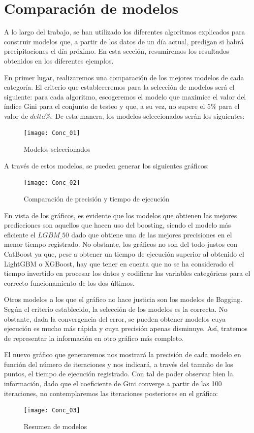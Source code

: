 \documentclass[12pt,twoside]{article}
\begin{document}
\newpage
\section{Comparación de modelos}

A lo largo del trabajo, se han utilizado los diferentes algoritmos explicados para construir modelos que, a partir de los datos de un día actual, predigan si habrá precipitaciones el día próximo. En esta sección, resumiremos los resultados obtenidos en los diferentes ejemplos.

En primer lugar, realizaremos una comparación de los mejores modelos de cada categoría. El criterio que estableceremos para la selección de modelos será el siguiente: para cada algoritmo, escogeremos el modelo que maximice el valor del índice Gini para el conjunto de testeo y que, a su vez, no supere el $5\%$ para el valor de $delta\%$. De esta manera, los modelos seleccionados serán los siguientes:
\begin{figure}[h]
\centering
\texttt{[image: Conc\_01]}
\caption{Modelos seleccionados}
\end{figure}

A través de estos modelos, se pueden generar los siguientes gráficos:
\begin{figure}[h]
\centering
\texttt{[image: Conc\_02]}
\caption{Comparación de precisión y tiempo de ejecución}
\end{figure}

En vista de los gráficos, es evidente que los modelos que obtienen las mejores predicciones son aquellos que hacen uso del boosting, siendo el modelo más eficiente el $LGBM\_50$ dado que obtiene una de las mejores precisiones en el menor tiempo registrado. No obstante, los gráficos no son del todo justos con CatBoost ya que, pese a obtener un tiempo de ejecución superior al obtenido el LightGBM o XGBoost, hay que tener en cuenta que no se ha considerado el tiempo invertido en procesar los datos y codificar las variables categóricas para el correcto funcionamiento de los dos últimos.

Otros modelos a los que el gráfico no hace justicia son los modelos de Bagging. Según el criterio establecido, la selección de los modelos es la correcta. No obstante, dada la convergencia del error, se pueden obtener modelos cuya ejecución es mucho más rápida y cuya precisión apenas disminuye. Así, tratemos de representar la información en otro gráfico más completo.

El nuevo gráfico que generaremos nos mostrará la precisión de cada modelo en función del número de iteraciones y nos indicará, a través del tamaño de los puntos, el tiempo de ejecución registrado. Con tal de poder observar bien la información, dado que el coeficiente de Gini converge a partir de las 100 iteraciones, no contemplaremos las iteraciones posteriores en el gráfico:
\begin{figure}[h]
\centering
\texttt{[image: Conc\_03]}
\caption{Resumen de modelos}
\end{figure}
\end{document}
